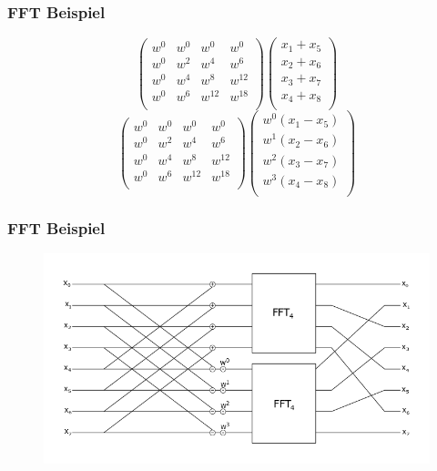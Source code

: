\frame
{
	\frametitle{FFT Beispiel}
	\begin{equation*}
	\left( \begin{array}{cccc}
w^{0} & w^{0} & w^{0} & w^{0}\\
w^{0} & w^{2} & w^{4} & w^{6}\\
w^{0} & w^{4} & w^{8} & w^{12}\\
w^{0} & w^{6} & w^{12} & w^{18}\\
\end{array} \right)
\left( \begin{array}{cccc}
x_1 + x_5\\
x_2 + x_6\\
x_3 + x_7\\
x_4 + x_8\\
\end{array} \right)
\end{equation*}
\begin{equation*}
\left( \begin{array}{cccc}
w^{0} & w^{0} & w^{0} & w^{0}\\
w^{0} & w^{2} & w^{4} & w^{6}\\
w^{0} & w^{4} & w^{8} & w^{12}\\
w^{0} & w^{6} & w^{12} & w^{18}\\
\end{array} \right)
\left( \begin{array}{cccc}
w^{0}(x_1 - x_5)\\
w^{1}(x_2 - x_6)\\
w^{2}(x_3 - x_7)\\
w^{3}(x_4 - x_8)\\
\end{array} \right)
\end{equation*}
}

\frame
{
	\frametitle{FFT Beispiel}
	\begin{figure}[h!]
		\centering
		\includegraphics[width=\linewidth, keepaspectratio]{../Pictures/FFTPres.png}
	\end{figure}
	
}


